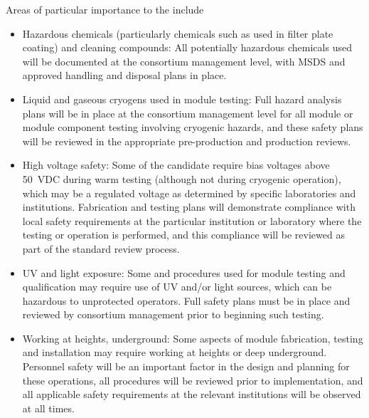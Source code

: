 Areas of particular importance to the  include
\begin{itemize}
\item Hazardous chemicals (particularly  chemicals such as  used in filter plate coating) and cleaning compounds:  All potentially hazardous chemicals used will be documented at the consortium management level, with MSDS and approved handling and disposal plans in place.

\item Liquid and gaseous cryogens used in module testing:  Full hazard analysis plans will be in place at the consortium management level for all module or module component testing involving cryogenic hazards, and these safety plans will be reviewed in the appropriate pre-production and production reviews.

\item High voltage safety:  Some of the candidate  require bias voltages above \SI{50}{VDC} during warm testing (although not during cryogenic operation), which may be a regulated voltage as determined by specific laboratories and institutions.  Fabrication and testing plans will demonstrate compliance with local  safety requirements at the particular institution or laboratory where the testing or operation is performed, and this compliance will be reviewed as part of the standard review process.

\item UV and  light exposure:  Some  and  procedures used for module testing and qualification may require use of UV and/or  light sources, which can be hazardous  to unprotected operators.  Full safety plans must be in place and reviewed by consortium management prior to beginning such testing.

\item Working at heights, underground:  Some aspects of  module fabrication, testing and installation may require working at heights or deep underground. Personnel safety will be an important factor in the design and planning for these operations, all procedures will be reviewed prior to implementation, and all applicable safety requirements at the relevant institutions will be observed at all times.
%

\end{itemize}
